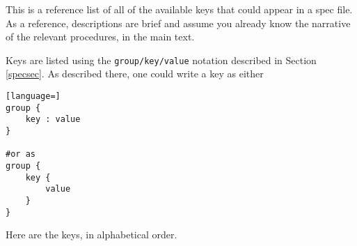 \documentclass{article}
\begin{document}
This is a reference list of all of the available keys that could appear in a spec file.
As a reference, descriptions are brief and assume you already know the narrative of the
relevant procedures, in the main text. 

Keys are listed using the {\tt group/key/value} notation described in Section \ref{specsec}. As described there, one could write a key as either 
\begin{lstlisting}[language=]
group {
    key : value
}

#or as
group {
    key { 
        value
    }
}
\end{lstlisting}

Here are the keys, in alphabetical order.




%
%
%
\end{document}
